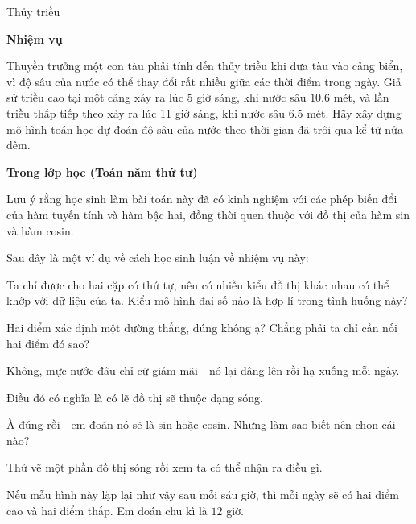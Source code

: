   {
    Thủy triều
  }
  {
    \textbf{Nhiệm vụ}

    Thuyền trưởng một con tàu phải tính đến thủy triều khi đưa tàu vào cảng biển, vì độ sâu của nước có thể thay đổi rất nhiều giữa các thời điểm trong ngày. Giả sử triều cao tại một cảng xảy ra lúc 5 giờ sáng, khi nước sâu $10.6$ mét, và lần triều thấp tiếp theo xảy ra lúc 11 giờ sáng, khi nước sâu $6.5$ mét. Hãy xây dựng mô hình toán học dự đoán độ sâu của nước theo thời gian đã trôi qua kể từ nửa đêm.\vspace{\baselineskip}

    \textbf{Trong lớp học (Toán năm thứ tư)}\vspace{\baselineskip}

    Lưu ý rằng học sinh làm bài toán này đã có kinh nghiệm với các phép biến đổi của hàm tuyến tính và hàm bậc hai, đồng thời quen thuộc với đồ thị của hàm sin và hàm cosin.\vspace{\baselineskip}

    Sau đây là một ví dụ về cách học sinh luận về nhiệm vụ này:

    \begin{scriptlist}
      \item [Giáo viên:] Ta chỉ được cho hai cặp có thứ tự, nên có nhiều kiểu đồ thị khác nhau có thể khớp với dữ liệu của ta. Kiểu mô hình đại số nào là hợp lí trong tình huống này?
      
      \item [Học sinh 1:] Hai điểm xác định một đường thẳng, đúng không ạ? Chẳng phải ta chỉ cần nối hai điểm đó sao?
      
      \item [Học sinh 2:] Không, mực nước đâu chỉ cứ giảm mãi---nó lại dâng lên rồi hạ xuống mỗi ngày.\vspace{\baselineskip}
      
      \item [Học sinh 3:] Điều đó có nghĩa là có lẽ đồ thị sẽ thuộc dạng sóng.\vspace{\baselineskip}
      
      \item [Học sinh 1:] À đúng rồi---em đoán nó sẽ là sin hoặc cosin. Nhưng làm sao biết nên chọn cái nào?
      
      \item [Học sinh 3:] Thử vẽ một phần đồ thị sóng rồi xem ta có thể nhận ra điều gì.
      
      \item [Học sinh 2:] Nếu mẫu hình này lặp lại như vậy sau mỗi sáu giờ, thì mỗi ngày sẽ có hai điểm cao và hai điểm thấp. Em đoán chu kì là $12$ giờ.\vspace{\baselineskip}


\end{scriptlist}}

